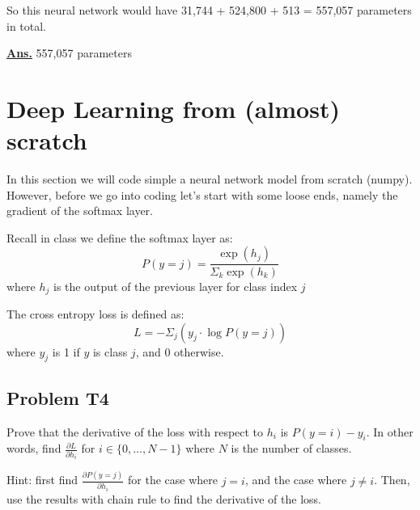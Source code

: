 \documentclass[12pt, a4paper]{article}
\newcommand{\ans}{\par\noindent\underline{\textbf{Ans.}} }
\begin{document}
            So this neural network would have 31,744 + 524,800 + 513 = 557,057 parameters in total.

            \ans 557,057 parameters
    
    \pagebreak

    \section{Deep Learning from (almost) scratch}

        In this section we will code simple a neural network model from scratch (numpy). However, before we go into coding let's start with some loose ends, namely the gradient of the softmax layer.

        Recall in class we define the softmax layer as:
        \begin{equation}
            P(y=j) = \frac{\exp(h_j)}{\Sigma_k \exp(h_k)}
        \end{equation}
        where $h_j$ is the output of the previous layer for class index $j$

        The cross entropy loss is defined as:
        \begin{equation}
            L = -\Sigma_j \left( y_j \cdot \log P(y=j) \right)
        \end{equation}
        where $y_j$ is 1 if $y$ is class $j$, and 0 otherwise.

        \subsection{Problem T4}
            Prove that the derivative of the loss with respect to $h_i$ is $P(y=i) - y_i$.
            In other words, find $\frac{\partial L}{\partial h_i}$ for $i \in \{0, \dots, N-1\}$ where $N$ is the number of classes.

            \noindent Hint: first find $\frac{\partial P(y=j)}{\partial h_i}$ for the case where $j = i$, and the case where $j \neq i$.
            Then, use the results with chain rule to find the derivative of the loss.
\end{document}
